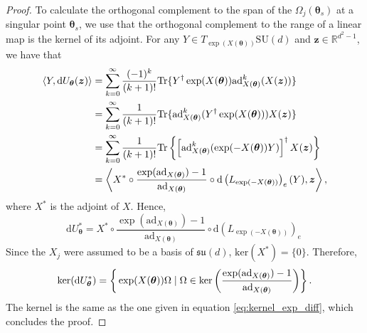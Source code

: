 \documentclass{article}
\renewcommand{\vec}[1]{\ensuremath{\boldsymbol{#1}}}
\begin{document}
\begin{proof}
    To calculate the orthogonal complement to the span of the \(\Omega_j(\vec{\theta}_s)\) at a singular point \(\vec{\theta}_s\), we use that the orthogonal complement to the range of a linear map is the kernel of its adjoint.
    For any \(Y \in T_{\exp(X(\vec{\theta}))}\mathrm{SU}(d)\) and \(\vec{z} \in \mathds{R}^{d^2-1}\), we have that
    \begin{align}
        \langle Y, \mathrm{d}U_{\vec{\theta}}(\vec{z})\rangle & = \sum_{k=0}^\infty \frac{(-1)^k}{(k+1)!} \mathrm{Tr}\{Y^\dagger\exp(X(\vec{\theta}))\mathrm{ad}_{X(\vec{\theta})}^k(X(\vec{z}))\}
         \nonumber \\
        & = \sum_{k=0}^\infty \frac{1}{(k+1)!} \mathrm{Tr} \{\mathrm{ad}_{X(\vec{\theta})}^k(Y^\dagger \exp(X(\vec{\theta})))X(\vec{z})\} \nonumber  \\
        & = \sum_{k=0}^\infty \frac{1}{(k+1)!} \mathrm{Tr}\left\{\left[\mathrm{ad}_{X(\vec{\theta})}^k(\exp(-X(\vec{\theta}))Y)\right]^\dagger X(\vec{z}) \vphantom{\left[\mathrm{ad}_{X(\vec{\theta})}^k(\exp(-X(\vec{\theta}))Y)\right]^\dagger} \right\} \nonumber \\
        & = \left\langle X^* \circ \frac{\exp(\mathrm{ad}_{X(\vec{\theta})}) - 1}{\mathrm{ad}_{X(\vec{\theta})}} \circ \mathrm{d}\left(L_{\exp(-X(\vec{\theta}))}\right)_e(Y), \vec{z} \vphantom{\frac{\exp(\mathrm{ad}_{X(\vec{\theta})}) - 1}{\mathrm{ad}_{X(\vec{\theta})}}} \right\rangle,
    \end{align}
    where \(X^*\) is the adjoint of \(X\).
    Hence,
    \begin{equation}
        \mathrm{d}U_{\vec{\theta}}^* = X^* \circ \frac{\exp(\mathrm{ad}_{X(\vec{\theta})}) - 1}{\mathrm{ad}_{X(\vec{\theta})}} \circ \mathrm{d}\left(L_{\exp(-X(\vec{\theta}))}\right)_e\
    \end{equation}
    Since the \(X_j\) were assumed to be a basis of \(\mathfrak{su}(d)\), \(\mathrm{ker}(X^*) = \{0\}\). Therefore,
    \begin{equation}
            \mathrm{ker}(\mathrm{d}U_{\vec{\theta}}^*) = \left\{\vphantom{\Omega \in \mathrm{ker}\left(\frac{\exp(\mathrm{ad}_{X(\vec{\theta})}) - 1}{\mathrm{ad}_{X(\vec{\theta})}}\right)} \exp(X(\vec{\theta})) \Omega \mid \Omega \in \mathrm{ker}\left(\frac{\exp(\mathrm{ad}_{X(\vec{\theta})}) - 1}{\mathrm{ad}_{X(\vec{\theta})}}\right)\right\}.
    \end{equation}
    The kernel is the same as the one given in equation \eqref{eq:kernel_exp_diff}, which concludes the proof.
\end{proof}
\end{document}
